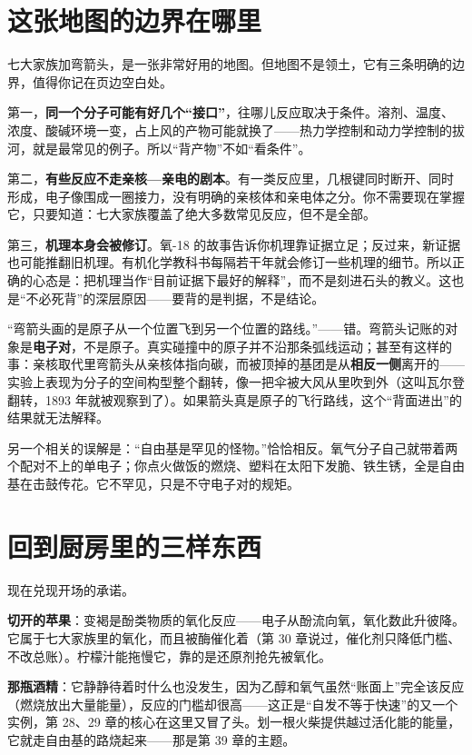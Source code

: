 \section{这张地图的边界在哪里}

七大家族加弯箭头，是一张非常好用的地图。但地图不是领土，它有三条明确的边界，值得你记在页边空白处。

第一，\textbf{同一个分子可能有好几个“接口”}，往哪儿反应取决于条件。溶剂、温度、浓度、酸碱环境一变，占上风的产物可能就换了——热力学控制和动力学控制的拔河，就是最常见的例子。所以“背产物”不如“看条件”。

第二，\textbf{有些反应不走亲核—亲电的剧本}。有一类反应里，几根键同时断开、同时形成，电子像围成一圈接力，没有明确的亲核体和亲电体之分。你不需要现在掌握它，只要知道：七大家族覆盖了绝大多数常见反应，但不是全部。

第三，\textbf{机理本身会被修订}。氧-18 的故事告诉你机理靠证据立足；反过来，新证据也可能推翻旧机理。有机化学教科书每隔若干年就会修订一些机理的细节。所以正确的心态是：把机理当作“目前证据下最好的解释”，而不是刻进石头的教义。这也是“不必死背”的深层原因——要背的是判据，不是结论。

\begin{wuqu}
“弯箭头画的是原子从一个位置飞到另一个位置的路线。”——错。弯箭头记账的对象是\textbf{电子对}，不是原子。真实碰撞中的原子并不沿那条弧线运动；甚至有这样的事：亲核取代里弯箭头从亲核体指向碳，而被顶掉的基团是从\textbf{相反一侧}离开的——实验上表现为分子的空间构型整个翻转，像一把伞被大风从里吹到外（这叫瓦尔登翻转，1893 年就被观察到了）。如果箭头真是原子的飞行路线，这个“背面进出”的结果就无法解释。

另一个相关的误解是：“自由基是罕见的怪物。”恰恰相反。氧气分子自己就带着两个配对不上的单电子；你点火做饭的燃烧、塑料在太阳下发脆、铁生锈，全是自由基在击鼓传花。它不罕见，只是不守电子对的规矩。
\end{wuqu}

\section{回到厨房里的三样东西}

现在兑现开场的承诺。

\textbf{切开的苹果}：变褐是酚类物质的氧化反应——电子从酚流向氧，氧化数此升彼降。它属于七大家族里的氧化，而且被酶催化着（第 30 章说过，催化剂只降低门槛、不改总账）。柠檬汁能拖慢它，靠的是还原剂抢先被氧化。

\textbf{那瓶酒精}：它静静待着时什么也没发生，因为乙醇和氧气虽然“账面上”完全该反应（燃烧放出大量能量），反应的门槛却很高——这正是“自发不等于快速”的又一个实例，第 28、29 章的核心在这里又冒了头。划一根火柴提供越过活化能的能量，它就走自由基的路烧起来——那是第 39 章的主题。

